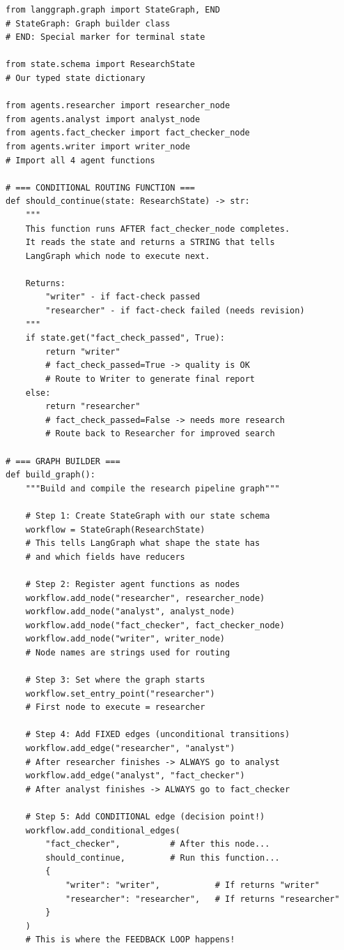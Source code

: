\documentclass[11pt,a4paper,twoside]{report}
\begin{document}
\begin{lstlisting}[style=pythonstyle,caption={workflow.py --- Every Line Explained}]
from langgraph.graph import StateGraph, END
# StateGraph: Graph builder class
# END: Special marker for terminal state

from state.schema import ResearchState
# Our typed state dictionary

from agents.researcher import researcher_node
from agents.analyst import analyst_node
from agents.fact_checker import fact_checker_node
from agents.writer import writer_node
# Import all 4 agent functions

# === CONDITIONAL ROUTING FUNCTION ===
def should_continue(state: ResearchState) -> str:
    """
    This function runs AFTER fact_checker_node completes.
    It reads the state and returns a STRING that tells
    LangGraph which node to execute next.

    Returns:
        "writer" - if fact-check passed
        "researcher" - if fact-check failed (needs revision)
    """
    if state.get("fact_check_passed", True):
        return "writer"
        # fact_check_passed=True -> quality is OK
        # Route to Writer to generate final report
    else:
        return "researcher"
        # fact_check_passed=False -> needs more research
        # Route back to Researcher for improved search

# === GRAPH BUILDER ===
def build_graph():
    """Build and compile the research pipeline graph"""

    # Step 1: Create StateGraph with our state schema
    workflow = StateGraph(ResearchState)
    # This tells LangGraph what shape the state has
    # and which fields have reducers

    # Step 2: Register agent functions as nodes
    workflow.add_node("researcher", researcher_node)
    workflow.add_node("analyst", analyst_node)
    workflow.add_node("fact_checker", fact_checker_node)
    workflow.add_node("writer", writer_node)
    # Node names are strings used for routing

    # Step 3: Set where the graph starts
    workflow.set_entry_point("researcher")
    # First node to execute = researcher

    # Step 4: Add FIXED edges (unconditional transitions)
    workflow.add_edge("researcher", "analyst")
    # After researcher finishes -> ALWAYS go to analyst
    workflow.add_edge("analyst", "fact_checker")
    # After analyst finishes -> ALWAYS go to fact_checker

    # Step 5: Add CONDITIONAL edge (decision point!)
    workflow.add_conditional_edges(
        "fact_checker",          # After this node...
        should_continue,         # Run this function...
        {
            "writer": "writer",           # If returns "writer"
            "researcher": "researcher",   # If returns "researcher"
        }
    )
    # This is where the FEEDBACK LOOP happens!


\end{lstlisting}
\end{document}
